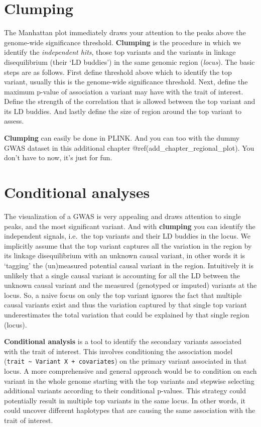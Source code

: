 \documentclass[
]{book}
\begin{document}
\hypertarget{clumping}{%
\section{Clumping}\label{clumping}}

The Manhattan plot immediately draws your attention to the peaks above the genome-wide significance threshold. \textbf{Clumping} is the procedure in which we identify the \emph{independent hits}, those top variants and the variants in linkage disequilibrium (their `LD buddies') in the same genomic region (\emph{locus}). The basic steps are as follows. First define threshold above which to identify the top variant, usually this is the genome-wide significance threshold. Next, define the maximum p-value of association a variant may have with the trait of interest. Define the strength of the correlation that is allowed between the top variant and its LD buddies. And lastly define the size of region around the top variant to assess.

\textbf{Clumping} can easily be done in PLINK. And you can too with the dummy GWAS dataset in this additional chapter @ref(add\_chapter\_regional\_plot). You don't have to now, it's just for fun.

\hypertarget{conditional-analyses}{%
\section{Conditional analyses}\label{conditional-analyses}}

The visualization of a GWAS is very appealing and draws attention to single peaks, and the most significant variant. And with \textbf{clumping} you can identify the independent signals, i.e.~the top variants and their LD buddies in the locus. We implicitly assume that the top variant captures all the variation in the region by its linkage disequilibrium with an unknown causal variant, in other words it is `tagging' the (un)measured potential causal variant in the region. Intuitively it is unlikely that a single causal variant is accounting for all the LD between the unknown causal variant and the measured (genotyped or imputed) variants at the locus. So, a naive focus on only the top variant ignores the fact that multiple causal variants exist and thus the variation captured by that single top variant underestimates the total variation that could be explained by that single region (locus).

\textbf{Conditional analysis} is a tool to identify the secondary variants associated with the trait of interest. This involves conditioning the association model (\texttt{trait\ \textasciitilde{}\ Variant\ X\ +\ covariates}) on the primary variant associated in that locus. A more comprehensive and general approach would be to condition on each variant in the whole genome starting with the top variants and stepwise selecting additional variants according to their conditional p-values. This strategy could potentially result in multiple top variants in the same locus. In other words, it could uncover different haplotypes that are causing the same association with the trait of interest.
\end{document}
